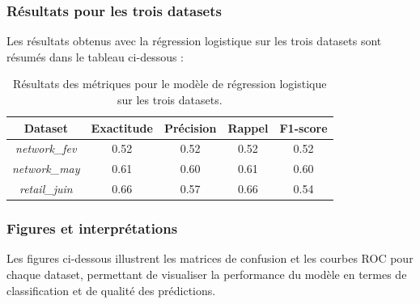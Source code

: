 \subsubsection{Résultats pour les trois datasets}

Les résultats obtenus avec la régression logistique sur les trois datasets sont résumés dans le tableau ci-dessous :

\begin{table}[H]
    \centering
    \begin{tabular}{|c|c|c|c|c|}
        \hline
        \textbf{Dataset} & \textbf{Exactitude} & \textbf{Précision} & \textbf{Rappel} & \textbf{F1-score} \\
        \hline
        \textit{network\_fev} & 0.52 & 0.52 & 0.52 & 0.52 \\
        \textit{network\_may} & 0.61 & 0.60 & 0.61 & 0.60 \\
        \textit{retail\_juin} & 0.66 & 0.57 & 0.66 & 0.54 \\
        \hline
    \end{tabular}
    \caption{Résultats des métriques pour le modèle de régression logistique sur les trois datasets.}
\end{table}

\subsubsection*{Figures et interprétations}
Les figures ci-dessous illustrent les matrices de confusion et les courbes ROC pour chaque dataset, permettant de visualiser la performance du modèle en termes de classification et de qualité des prédictions.

